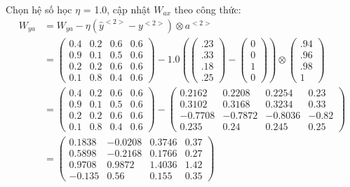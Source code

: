 Chọn hệ số học $\eta$ = 1.0, cập nhật $W_{ax}$ theo công thức:\\
\begin{equation*} 
    \begin{split}
    W_{ya} & = W_{ya} - \eta (\widehat{y}^{<2>} - y^{<2>}) \otimes a^{<2>} \\
     & = \begin{pmatrix}0.4 & 0.2 & 0.6 & 0.6\\0.9 & 0.1 & 0.5 & 0.6\\ 0.2 & 0.2 & 0.6 & 0.6 \\0.1 & 0.8 & 0.4 & 0.6\end{pmatrix} - 1.0 (\begin{pmatrix}.23\\.33\\.18\\.25 \end{pmatrix}-
    \begin{pmatrix}0\\0\\1\\0\end{pmatrix}) \otimes \begin{pmatrix}.94\\.96\\.98\\1 \end{pmatrix} \\
     & = \begin{pmatrix}0.4 & 0.2 & 0.6 & 0.6\\0.9 & 0.1 & 0.5 & 0.6\\ 0.2 & 0.2 & 0.6 & 0.6 \\0.1 & 0.8 & 0.4 & 0.6\end{pmatrix} - \begin{pmatrix}0.2162 & 0.2208 & 0.2254 & 0.23\\0.3102 & 0.3168 & 0.3234 & 0.33\\ -0.7708 & -0.7872 & -0.8036 & -0.82 \\0.235 & 0.24 & 0.245 & 0.25 \end{pmatrix} \\
     & = \begin{pmatrix}0.1838 & -0.0208 & 0.3746 & 0.37\\0.5898 & -0.2168 & 0.1766 & 0.27\\ 0.9708 & 0.9872 & 1.4036 & 1.42 \\-0.135 & 0.56 & 0.155 & 0.35 \end{pmatrix}
    \end{split}
\end{equation*}

